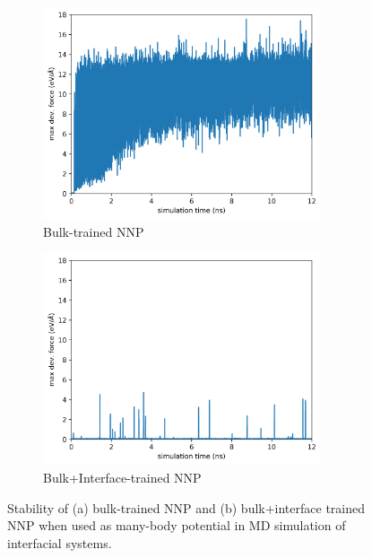 \begin{figure}[tbhp]
	\centering
	\begin{subfigure}{0.48\textwidth}
		\centering

		\includegraphics[width=0.9\textwidth]{images/deviation_bulk}
		\caption{Bulk-trained NNP}\label{fig:dev_bulk}
	\end{subfigure}
	\hfill
	\begin{subfigure}{0.48\textwidth}
		\centering

		\includegraphics[width=0.9\textwidth]{images/deviation_bulk+interface}
		\caption{Bulk+Interface-trained NNP}\label{fig:dev_bulk_interface}
	\end{subfigure}

	\caption{Stability of (a) bulk-trained NNP and (b) bulk+interface
		trained NNP when used as many-body potential in MD simulation of
		interfacial
		systems. }\label{fig:model_dev}
\end{figure}

